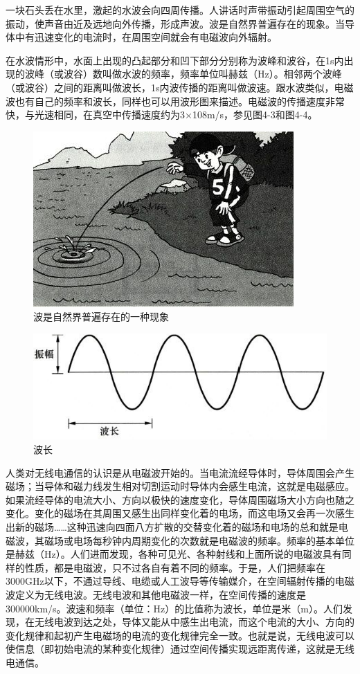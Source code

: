 \documentclass[12pt,UTF8]{ctexbook}
\begin{document}
一块石头丢在水里，激起的水波会向四周传播。人讲话时声带振动引起周围空气的振动，使声音由近及远地向外传播，形成声波。波是自然界普遍存在的现象。当导体中有迅速变化的电流时，在周围空间就会有电磁波向外辐射。

在水波情形中，水面上出现的凸起部分和凹下部分分别称为波峰和波谷，在1s内出现的波峰（或波谷）数叫做水波的频率，频率单位叫赫兹（Hz）。相邻两个波峰（或波谷）之间的距离叫做波长，1s内波传播的距离叫做波速。跟水波类似，电磁波也有自己的频率和波长，同样也可以用波形图来描述。电磁波的传播速度非常快，与光速相同，在真空中传播速度约为3×108m/s，参见图4-3和图4-4。

\begin{figure}[htbp]
	\centering
	\includegraphics[width=0.7\linewidth]{46}
	\caption{波是自然界普遍存在的一种现象}
	\label{fig:1}
\end{figure}

\begin{figure}[htbp]
	\centering
	\includegraphics[width=0.7\linewidth]{47}
	\caption{波长}
	\label{fig:1}
\end{figure}

人类对无线电通信的认识是从电磁波开始的。当电流流经导体时，导体周围会产生磁场；当导体和磁力线发生相对切割运动时导体内会感生电流，这就是电磁感应。如果流经导体的电流大小、方向以极快的速度变化，导体周围磁场大小方向也随之变化。变化的磁场在其周围又感生出同样变化着的电场，而这电场又会再一次感生出新的磁场……这种迅速向四面八方扩散的交替变化着的磁场和电场的总和就是电磁波，其磁场或电场每秒钟内周期变化的次数就是电磁波的频率。频率的基本单位是赫兹（Hz）。人们进而发现，各种可见光、各种射线和上面所说的电磁波具有同样的性质，都是电磁波，只不过各自有着不同的频率。于是，人们把频率在3000GHz以下，不通过导线、电缆或人工波导等传输媒介，在空间辐射传播的电磁波定义为无线电波。无线电波和其他电磁波一样，在空间传播的速度是300000km/s。波速和频率（单位：Hz）的比值称为波长，单位是米（m）。人们发现，在无线电波到达之处，导体又能从中感生出电流，而这个电流的大小、方向的变化规律和起初产生电磁场的电流的变化规律完全一致。也就是说，无线电波可以使信息（即初始电流的某种变化规律）通过空间传播实现远距离传递，这就是无线电通信。
\end{document}
